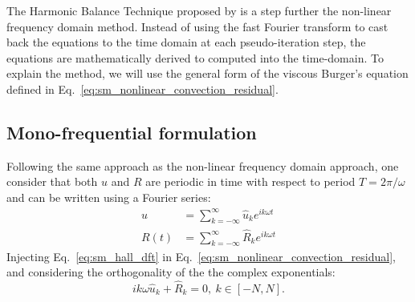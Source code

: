 
The Harmonic Balance Technique proposed by \citet{Hall2002}
is a step further the non-linear frequency domain method. Instead
of using the fast Fourier transform to cast back the equations
to the time domain at each pseudo-iteration step, 
the equations are mathematically derived to 
computed into the time-domain.
To explain the method, we will use the general form of 
the viscous Burger's equation defined in 
Eq.~\ref{eq:sm_nonlinear_convection_residual}.

\subsection{Mono-frequential formulation}

Following the same approach as the non-linear frequency domain approach,
one consider that both $u$ and $R$ are periodic
in time with respect to period $T = 2 \pi / \omega$
and can be written using a Fourier series:
\begin{equation}
	\begin{split}
		u &= \sum_{k=-\infty}^{\infty} \widehat{u}_k e^{i k \omega t} \\
		R(t) &= \sum_{k=-\infty}^{\infty} \widehat{R}_k e^{i k \omega t}
		\label{eq:sm_hall_dft}
	\end{split}
\end{equation}
Injecting Eq.~\ref{eq:sm_hall_dft} in 
Eq.~\ref{eq:sm_nonlinear_convection_residual}, and considering
the orthogonality of the the complex exponentials:
\begin{equation}
	i k \omega \widehat{u}_k + \widehat{R}_k = 0, \: k \in [-N, N].
	\label{eq:sm_hall_frequential_eq}
\end{equation}

